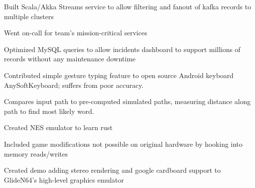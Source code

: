 \documentclass[12pt]{jmichaud-resume}
\begin{document}
\begin{minipage}[t]{0.64\textwidth}
\begin{tightemize}
	\item Built Scala/Akka Streams service to allow filtering and fanout of kafka records to multiple clusters
	\item Went on-call for team's mission-critical services
	
\end{tightemize}
\sectionsep
{}\hfill {}

\vspace{3pt}

\begin{tightemize}
	\item Optimized MySQL queries to allow incidents dashboard to support millions of records without any maintenance downtime
\end{tightemize}
\sectionsep

 \hfill {}

\sectionsep

 \hfill {}

\sectionsep

 \hfill
{}
\begin{tightemize}
	\item Contributed simple gesture typing feature to open source Android keyboard AnySoftKeyboard; suffers from poor accuracy.
	\item Compares input path to pre-computed simulated paths, measuring distance along path to find most likely word.
\end{tightemize}

\sectionsep

 \hfill
{}
\begin{tightemize}
	\item Created NES emulator to learn rust
	\item Included game modifications not possible on original hardware by hooking into memory reads/writes
\end{tightemize}

\sectionsep
{} \hfill
{}
\begin{tightemize}
	\item Created demo adding stereo rendering and google cardboard support to GlideN64's high-level graphics emulator
\end{tightemize}
\sectionsep

\end{minipage}
\end{document}

